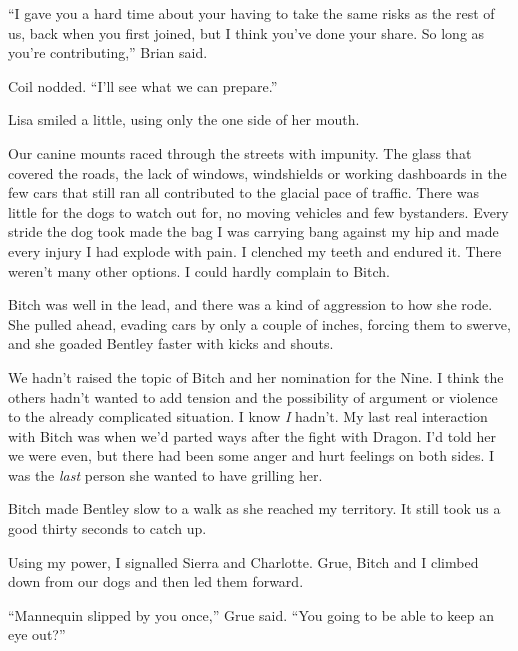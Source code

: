 ``I gave you a hard time about your having to take the same risks as the rest of us, back when you first joined, but I think you've done your share.  So long as you're contributing,'' Brian said.



Coil nodded. ``I'll see what we can prepare.''



Lisa smiled a little, using only the one side of her mouth.



\sectionbreak



Our canine mounts raced through the streets with impunity.  The glass that covered the roads, the lack of windows, windshields or working dashboards in the few cars that still ran all contributed to the glacial pace of traffic.  There was little for the dogs to watch out for, no moving vehicles and few bystanders.  Every stride the dog took made the bag I was carrying bang against my hip and made every injury I had explode with pain.  I clenched my teeth and endured it.  There weren't many other options.  I could hardly complain to Bitch.



Bitch was well in the lead, and there was a kind of aggression to how she rode.  She pulled ahead, evading cars by only a couple of inches, forcing them to swerve, and she goaded Bentley faster with kicks and shouts.



We hadn't raised the topic of Bitch and her nomination for the Nine.  I think the others hadn't wanted to add tension and the possibility of argument or violence to the already complicated situation.  I know \emph{I} hadn't.  My last real interaction with Bitch was when we'd parted ways after the fight with Dragon.  I'd told her we were even, but there had been some anger and hurt feelings on both sides.  I was the \emph{last} person she wanted to have grilling her.



Bitch made Bentley slow to a walk as she reached my territory.  It still took us a good thirty seconds to catch up.



Using my power, I signalled Sierra and Charlotte.  Grue, Bitch and I climbed down from our dogs and then led them forward.



``Mannequin slipped by you once,'' Grue said.  ``You going to be able to keep an eye out?''



